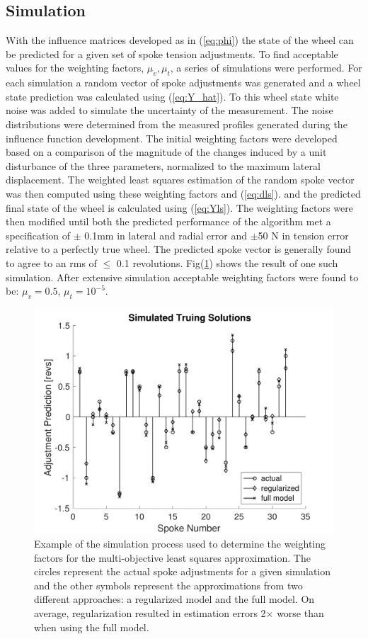 \documentclass[journal]{IEEEtran}
\begin{document}
\subsection{Simulation}
With the influence matrices developed as in (\ref{eq:phi}) the state of the wheel can be predicted for a given set of spoke tension adjustments.  To find acceptable values for the weighting factors, $\mu_v,\mu_t$, a series of simulations were performed.  For each simulation a random vector of spoke adjustments was generated and a wheel state prediction was calculated using (\ref{eq:Y_hat}). To this wheel state white noise was added to simulate the uncertainty of the measurement.  The noise distributions were determined from the measured profiles generated during the influence function development.  The initial weighting factors were developed based on a comparison of the magnitude of the changes induced by a unit disturbance of the three parameters, normalized to the maximum lateral displacement. The weighted least squares estimation of the random spoke vector was then computed using these weighting factors and (\ref{eq:dls}). and the predicted final state of the wheel is calculated using (\ref{eq:Yls}). The weighting factors were then modified until both the predicted performance of the algorithm met a specification of $\pm$ 0.1mm in lateral and radial error and $\pm$50 N in tension error relative to a perfectly true wheel. The predicted spoke vector is generally found to agree to an rms of $\leq$ 0.1 revolutions. Fig(\ref{fig:simd}) shows the result of one such simulation. After extensive simulation acceptable weighting factors were found to be: $\mu_v = 0.5$, $ \mu_t =10^{-5}$.

\begin{figure}[!t]
\centering
\includegraphics[width=3.25 in]{./figs/simd2}
\caption{Example of the simulation process used to determine the weighting factors for the multi-objective least squares approximation. The circles represent the actual spoke adjustments for a given simulation and the other symbols represent the approximations from two different approaches: a regularized model and the full model.  On average, regularization resulted in estimation errors 2$\times$ worse than when using the full model.}
\label{fig:simd}
\end{figure}
\end{document}
